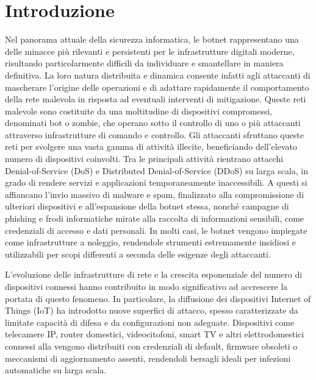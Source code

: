 \chapter{Introduzione}
Nel panorama attuale della sicurezza informatica, le botnet rappresentano una delle minacce più rilevanti e persistenti per le infrastrutture digitali moderne, risultando particolarmente difficili da individuare e smantellare in maniera definitiva. La loro natura distribuita e dinamica consente infatti agli attaccanti di mascherare l'origine delle operazioni e di adattare rapidamente il comportamento della rete malevola in risposta ad eventuali interventi di mitigazione. Queste reti malevole sono costituite da una moltitudine di dispositivi compromessi, denominati bot o zombie, che operano sotto il controllo di uno o più attaccanti attraverso infrastrutture di comando e controllo. Gli attaccanti sfruttano queste reti per svolgere una vasta gamma di attività illecite, beneficiando dell'elevato numero di dispositivi coinvolti. Tra le principali attività rientrano attacchi Denial-of-Service (DoS) e Distributed Denial-of-Service (DDoS) su larga scala, in grado di rendere servizi e applicazioni temporaneamente inaccessibili. A questi si affiancano l'invio massivo di malware e spam, finalizzato alla compromissione di ulteriori dispositivi e all'espansione della botnet stessa, nonché campagne di phishing e frodi informatiche mirate alla raccolta di informazioni sensibili, come credenziali di accesso e dati personali. In molti casi, le botnet vengono impiegate come infrastrutture a noleggio, rendendole strumenti estremamente insidiosi e utilizzabili per scopi differenti a seconda delle esigenze degli attaccanti. 

L'evoluzione delle infrastrutture di rete e la crescita esponenziale del numero di dispositivi connessi hanno contribuito in modo significativo ad accrescere la portata di questo fenomeno. In particolare, la diffusione dei dispositivi Internet of Things (IoT) ha introdotto nuove superfici di attacco, spesso caratterizzate da limitate capacità di difesa e da configurazioni non adeguate. Dispositivi come telecamere IP, router domestici, videocitofoni, smart TV e altri elettrodomestici connessi alla vengono distribuiti con credenziali di default, firmware obsoleti o meccanismi di aggiornamento assenti, rendendoli bersagli ideali per infezioni automatiche su larga scala. 

